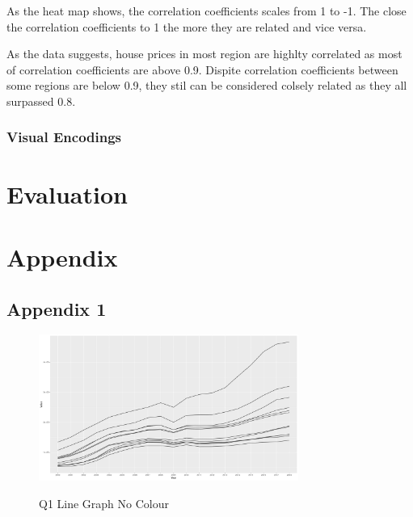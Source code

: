 \documentclass{article}
\begin{document}
As the heat map shows, the correlation coefficients scales from 1 to -1. The close the correlation coefficients 
to 1 the more they are related and vice versa.

As the data suggests, house prices in most region are highlty correlated as most of correlation coefficients 
are above 0.9. Dispite correlation coefficients between some regions are below 0.9, they stil can be 
considered colsely related as they all surpassed 0.8.

\subsubsection{Visual Encodings}




\section{Evaluation}




\vfill\pagebreak
\printbibliography


\vfill\pagebreak
\vfill\pagebreak

\section*{Appendix}
\subsection{Appendix 1}
\begin{figure}[H]
  \begin{minipage}[b]{1.0\linewidth}
    \centering
    \centerline{\includegraphics[width=8.5cm]{Q1Geom_line_no_colour}}
    \centerline{Q1 Line Graph No Colour}\medskip
  \end{minipage}
\end{figure}
\end{document}
